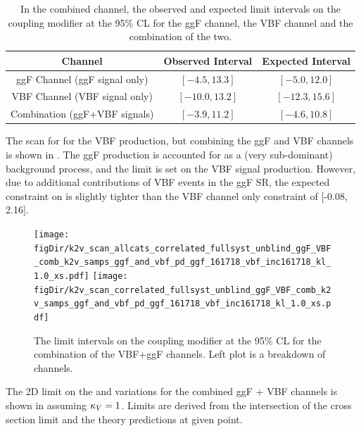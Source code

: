 \begin{table}[h]
	\centering
	\caption{In the combined channel, the observed and expected limit intervals on the coupling modifier \kl at the 95\% CL for the ggF channel, the VBF channel and the combination of the two.}
	\begin{tabular}{c c c}
		\toprule
		{Channel} & {Observed Interval} & {Expected Interval} \\
		\midrule
		{ggF Channel (ggF signal only)} & {$[-4.5, 13.3]$} & {$[-5.0, 12.0]$}  \\
		{VBF Channel (VBF signal only)}  & {$[-10.0, 13.2]$} & {$[-12.3, 15.6]$} \\
		{Combination (ggF+VBF signals)} & {$[-3.9, 11.2]$} & {$[-4.6, 10.8]$}  \\
		\bottomrule
	\end{tabular}
\label{table:kl-chan-comp-tab}
\end{table}

The scan for \kvv for the VBF production, but combining the ggF and VBF channels is shown in \Fig{\ref{fig:k2v-comb}}.
The ggF production is accounted for as a (very sub-dominant) background process, and the limit is set on the VBF signal production.
However, due to additional contributions of VBF events in the ggF SR, the expected constraint on \kvv [-0.05, 2.12] is slightly tighter than the VBF channel only constraint of [-0.08, 2.16].

\begin{figure}[ht]
	\centering
	\texttt{[image: \\figDir/k2v\_scan\_allcats\_correlated\_fullsyst\_unblind\_ggF\_VBF\_comb\_k2v\_samps\_ggf\_and\_vbf\_pd\_ggf\_161718\_vbf\_inc161718\_kl\_1.0\_xs.pdf]}
	\texttt{[image: \\figDir/k2v\_scan\_correlated\_fullsyst\_unblind\_ggF\_VBF\_comb\_k2v\_samps\_ggf\_and\_vbf\_pd\_ggf\_161718\_vbf\_inc161718\_kl\_1.0\_xs.pdf]}
	\caption{The limit intervals on the coupling modifier \kvv at the 95\% CL for the combination of the VBF+ggF channels.
	Left plot is a breakdown of channels.
	}
	\label{fig:k2v-comb}
\end{figure}

The 2D limit on the \kvv and \kl variations for the combined ggF + VBF channels is shown in \Fig{\ref{fig:2d-lim}} assuming $\kappa_V = 1$.
Limits are derived from the intersection of the cross section limit and the theory predictions at given point.

